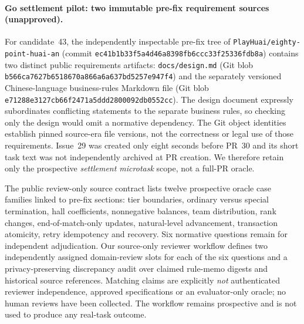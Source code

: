 \documentclass[pdflatex,sn-basic]{sn-jnl}
\begin{document}
\paragraph{Go settlement pilot: two immutable pre-fix requirement sources (unapproved).}
For candidate~43, the independently inspectable pre-fix tree of
\texttt{PlayHuai/eighty-point-huai-an}
(commit \texttt{ec41b1b33f5a4d46a8398fb6ccc33f25336fdb8a})
contains two distinct public requirements artifacts:
\texttt{docs/design.md} (Git blob
\texttt{b566ca7627b6518670a866a6a637bd5257e947f4})
and the separately versioned Chinese-language business-rules Markdown file
(Git blob \texttt{e71288e3127cb66f2471a5ddd2800092db0552cc}).
The design document expressly subordinates conflicting
statements to the separate business rules, so checking only
the design would omit a normative dependency. The Git
object identities establish pinned source-era file versions,
not the correctness or legal use of those requirements.
Issue~29 was created only eight seconds before PR~30
and its short task text was not independently archived
at PR creation. We therefore retain only the prospective
\emph{settlement microtask} scope, not a full-PR oracle.

The public review-only source contract lists twelve
prospective oracle case families linked to pre-fix
sections: tier boundaries, ordinary versus special
termination, hall coefficients, nonnegative balances,
team distribution, rank changes, end-of-match-only
updates, natural-level advancement, transaction
atomicity, retry idempotency and recovery. Six
normative questions remain for independent adjudication.
Our source-only reviewer workflow defines two independently
assigned domain-review slots for each of the six questions
and a privacy-preserving discrepancy audit over claimed
rule-memo digests and historical source references.
Matching claims are explicitly \emph{not} authenticated
reviewer independence, approved specifications or an
evaluator-only oracle; no human reviews have been collected.
The workflow remains prospective and is not used to
produce any real-task outcome.
\end{document}
